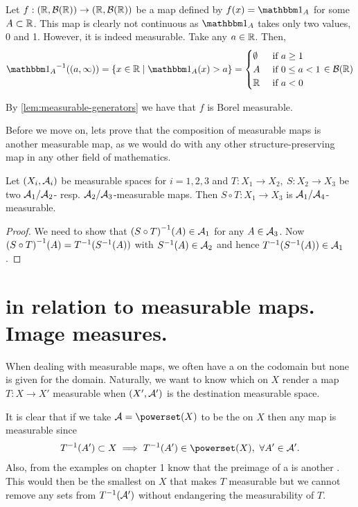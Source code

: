 \begin{eg}
	Let $f:(\mathbb{R}, \mathcal{B}(\mathbb{R})) \to (\mathbb{R}, \mathcal{B}(\mathbb{R}))$ be a map defined by $f(x) = \ind_{A}$ for some $A \subset \mathbb{R}$. This map is clearly not continuous as $\ind_A$ takes only two values, 0 and 1. However, it is indeed measurable. Take any $a \in \mathbb{R}$. Then,
	\begin{align*}
		\inv{\ind_A}((a, \infty)) = \{x \in \R \mid \ind_A(x) > a\} =
		\begin{cases}
		\emptyset \tif a \geq 1 \\
		A \tif 0 \leq a < 1 \\
		\R \tif a < 0
		\end{cases} \in \borel(\R)
	\end{align*}
	
	By \autoref{lem:measurable-generators} we have that $f$ is Borel measurable.
\end{eg}

Before we move on, lets prove that the composition of measurable maps is another measurable map, as we would do with any other structure-preserving map in any other field of mathematics.

\begin{lem}
	Let $(X_i, \mathcal{A}_i)$ be measurable spaces for $i = 1, 2, 3$ and $T: X_1 \to X_2,\ S: X_2 \to X_3$ be two $\mathcal{A}_1/\mathcal{A}_2$- resp. $\mathcal{A}_2/\mathcal{A}_3$-measurable maps. Then $S \circ T: X_1 \to X_3$ is $\mathcal{A}_1/\mathcal{A}_4$-measurable.
\end{lem}

\begin{proof}
	We need to show that ${(S \circ T)}^{-1}(A) \in \mathcal{A}_1$ for any $A \in \mathcal{A}_3$. Now ${(S \circ T)}^{-1}(A) = {T}^{-1}({S}^{-1}(A))$ with ${S}^{-1}(A) \in \mathcal{A}_2$ and hence ${T}^{-1}({S}^{-1}(A)) \in \mathcal{A}_1$.
\end{proof}

\section{\sigas in relation to measurable maps. Image measures.}

When dealing with measurable maps, we often have a \siga on the codomain but none is given for the domain. Naturally, we want to know which \sigas on $X$ render a map $T:X \to X'$ measurable when $(X', \mathcal{A}')$ is the destination measurable space.

It is clear that if we take $\sa = \powerset(X)$ to be the \siga on $X$ then any map is measurable since
\begin{align*}
	\inv{T}(A') \subset X \implies \inv{T}(A') \in \powerset(X),\ \forall A' \in \sa'.
\end{align*}
Also, from the examples on chapter 1 know that the preimage of a \siga is another \siga. This would then be the smallest \siga on $X$ that makes $T$ measurable but we cannot remove any sets from ${T}^{-1}(\mathcal{A}')$ without endangering the measurability of $T$.

